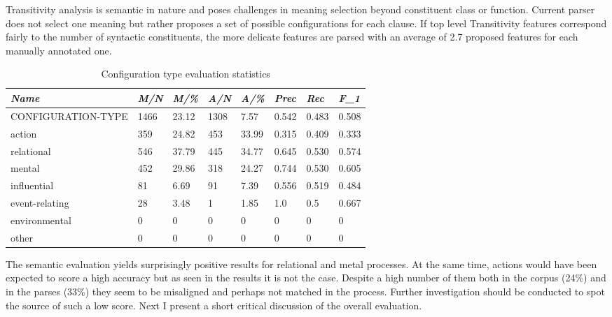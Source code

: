 Transitivity analysis is semantic in nature and poses challenges in meaning selection beyond constituent class or function. Current parser does not select one meaning but rather proposes a set of possible configurations for each clause. If top level Transitivity features correspond fairly to the number of syntactic constituents, the more delicate features are parsed with an average of 2.7 proposed features for each manually annotated one.

\begin{table}[H]
	\centering
	\begin{tabulary}{\linewidth}{|L|l|l|l|l|l|l|l|}
		\hline
		\textit{Name} & \textit{M/N} & \textit{M/\%} & \textit{A/N} & \textit{A/\%} & \textit{Prec} & \textit{Rec} & \textit{F_{1}} \\ \hline
		\rule[-2ex]{0pt}{5.5ex} CONFIGURATION-TYPE
		& 1466
		& 23.12
		& 1308
		& 7.57 & 0.542
		& 0.483
		& 0.508
		\\ 
		\hline \rule[-2ex]{0pt}{5.5ex} action
		& 359
		& 24.82
		& 453
		& 33.99
		& 0.315
		& 0.409
		& 0.333
		\\ 
		\hline \rule[-2ex]{0pt}{5.5ex} relational
		& 546
		& 37.79
		& 445
		& 34.77
		& 0.645
		& 0.530
		& 0.574
		\\ 
		\hline \rule[-2ex]{0pt}{5.5ex} mental
		& 452
		& 29.86
		& 318
		& 24.27
		& 0.744
		& 0.530
		& 0.605
		\\ 
		\hline \rule[-2ex]{0pt}{5.5ex} influential
		& 81
		& 6.69
		& 91
		& 7.39
		& 0.556
		& 0.519
		& 0.484
		\\ 
		\hline \rule[-2ex]{0pt}{5.5ex} event-relating
		& 28
		& 3.48
		& 1
		& 1.85
		& 1.0 & 0.5 & 0.667
		\\ 
		\hline \rule[-2ex]{0pt}{5.5ex} environmental
		& 0 & 0 & 0 & 0 & 0 & 0 & 0 \\ 
		\hline \rule[-2ex]{0pt}{5.5ex} other & 0 & 0 & 0 & 0 & 0 & 0 & 0 \\ 
		\hline 
	\end{tabulary}
	\caption{Configuration type evaluation statistics}
	\label{tab:configuration-statistics}
\end{table}

The semantic evaluation yields surprisingly positive results for relational and metal processes. At the same time, actions would have been expected to score a high accuracy but as seen in the results it is not the case. Despite a high number of them both in the corpus (24\%) and in the parses (33\%) they seem to be misaligned and perhaps not matched in the process. Further investigation should be conducted to spot the source of such a low score. Next I present a short critical discussion of the overall evaluation. 

